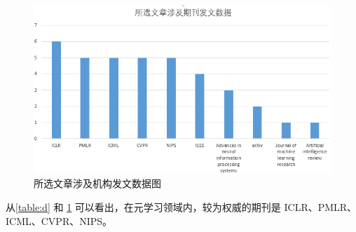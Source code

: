     \begin{figure}[htbp]
        \centering
        \includegraphics[width=.7\linewidth]{figure/fd.png}
        \caption{所选文章涉及机构发文数据图}
        \label{fig:fd}
    \end{figure}
    
    从\ref{table:d} 和 \ref{fig:fd} 可以看出，在元学习领域内，较为权威的期刊是 ICLR、PMLR、ICML、CVPR、NIPS。